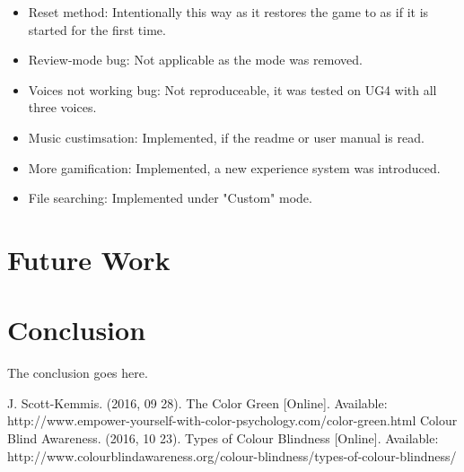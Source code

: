 \documentclass[conference]{IEEEtran}
\begin{document}
\begin{itemize}
			\item Reset method: Intentionally this way as it restores the game to as if it is started for the first time.
			\item Review-mode bug: Not applicable as the mode was removed.
			\item Voices not working bug: Not reproduceable, it was tested on UG4 with all three voices.
			\item Music custimsation: Implemented, if the readme or user manual is read.
			\item More gamification: Implemented, a new experience system was introduced.
			\item File searching: Implemented under "Custom" mode.
		\end{itemize}

\section{Future Work}

\section{Conclusion}
The conclusion goes here.



%
%
%
\begin{thebibliography}{1}
J. Scott-Kemmis. (2016, 09 28). The Color Green [Online]. Available: http://www.empower-yourself-with-color-psychology.com/color-green.html
Colour Blind Awareness. (2016, 10 23). Types of Colour Blindness [Online]. Available: http://www.colourblindawareness.org/colour-blindness/types-of-colour-blindness/
\end{thebibliography}




\end{document}
